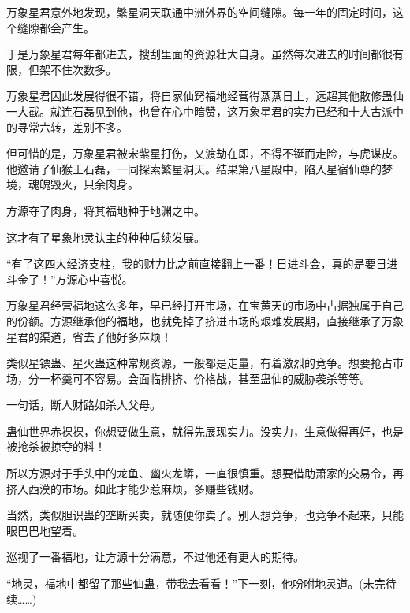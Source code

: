 \begin{this_body}
万象星君意外地发现，繁星洞天联通中洲外界的空间缝隙。每一年的固定时间，这个缝隙都会产生。

于是万象星君每年都进去，搜刮里面的资源壮大自身。虽然每次进去的时间都很有限，但架不住次数多。

万象星君因此发展得很不错，将自家仙窍福地经营得蒸蒸日上，远超其他散修蛊仙一大截。就连石磊见到他，也曾在心中暗赞，这万象星君的实力已经和十大古派中的寻常六转，差别不多。

但可惜的是，万象星君被宋紫星打伤，又渡劫在即，不得不铤而走险，与虎谋皮。他邀请了仙猴王石磊，一同探索繁星洞天。结果第八星殿中，陷入星宿仙尊的梦境，魂魄毁灭，只余肉身。

方源夺了肉身，将其福地种于地渊之中。

这才有了星象地灵认主的种种后续发展。

“有了这四大经济支柱，我的财力比之前直接翻上一番！日进斗金，真的是要日进斗金了！”方源心中喜悦。

万象星君经营福地这么多年，早已经打开市场，在宝黄天的市场中占据独属于自己的份额。方源继承他的福地，也就免掉了挤进市场的艰难发展期，直接继承了万象星君的渠道，省去了他好多麻烦！

类似星镖蛊、星火蛊这种常规资源，一般都是走量，有着激烈的竞争。想要抢占市场，分一杯羹可不容易。会面临排挤、价格战，甚至蛊仙的威胁袭杀等等。

一句话，断人财路如杀人父母。

蛊仙世界赤裸裸，你想要做生意，就得先展现实力。没实力，生意做得再好，也是被抢杀被掠夺的料！

所以方源对于手头中的龙鱼、幽火龙蟒，一直很慎重。想要借助萧家的交易令，再挤入西漠的市场。如此才能少惹麻烦，多赚些钱财。

当然，类似胆识蛊的垄断买卖，就随便你卖了。别人想竞争，也竞争不起来，只能眼巴巴地望着。

巡视了一番福地，让方源十分满意，不过他还有更大的期待。

“地灵，福地中都留了那些仙蛊，带我去看看！”下一刻，他吩咐地灵道。(未完待续……)

\end{this_body}

